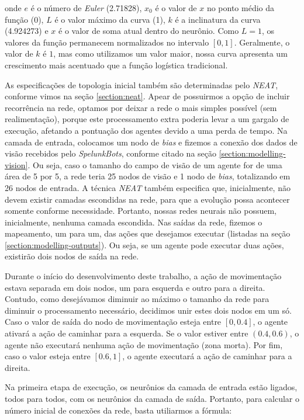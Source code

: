 onde $e$ é o número de \textit{Euler} (2.71828), $x_{0}$ é o valor de $x$ no
ponto médio da função (0), $L$ é o valor máximo da curva (1), $k$ é a
inclinatura da curva (4.924273) e $x$ é o valor de soma atual dentro do
neurônio. Como $L=1$, os valores da função permanecem normalizados no intervalo
$[0,1]$. Geralmente, o valor de $k$ é $1$, mas como utilizamos um valor maior,
nossa curva apresenta um crescimento mais acentuado que a função logística
tradicional.

As especificações de topologia inicial também são determinadas pelo
\textit{NEAT}, conforme vimos na seção \ref{section:neat}. Apear de possuirmos a
opção de incluir recorrência na rede, optamos por deixar a rede o mais simples
possível (sem realimentação), porque este processamento extra poderia levar a um
gargalo de execução, afetando a pontuação dos agentes devido a uma perda de
tempo. Na camada de entrada, colocamos um nodo de \textit{bias} e  fizemos a
conexão dos dados de visão recebidos pelo \textit{SpelunkBots}, conforme citado
na seção \ref{section:modelling-vision}. Ou seja, caso o tamanho do campo de
visão de um agente for de uma área de 5 por 5, a rede teria 25 nodos de visão e
1 nodo de \textit{bias}, totalizando em 26 nodos de entrada. A técnica
\textit{NEAT} também especifica que, inicialmente, não devem existir camadas
escondidas na rede, para que a evolução possa acontecer somente conforme
necessidade. Portanto, nossas redes neurais não possuem, inicialmente, nenhuma
camada escondida. Nas saídas da rede, fizemos o mapeamento, um para um, das
ações que desejamos executar (listadas na seção \ref{section:modelling-outputs}).
Ou seja, se um agente pode executar duas ações, existirão dois nodos de saída na
rede.

Durante o início do desenvolvimento deste trabalho, a ação de movimentação
estava separada em dois nodos, um para esquerda e outro para a direita. Contudo,
como desejávamos diminuir ao máximo o tamanho da rede para diminuir o
processamento necessário, decidimos unir estes dois nodos em um só. Caso o valor
de saída do nodo de movimentação esteja entre $[0,0.4]$, o agente ativará a ação
de caminhar para a esquerda. Se o valor estiver entre $(0.4,0.6)$, o agente não
executará nenhuma ação de movimentação (zona morta). Por fim, caso o valor
esteja entre $[0.6,1]$, o agente executará a ação de caminhar para a direita.

Na primeira etapa de execução, os neurônios da camada de entrada estão ligados,
todos para todos, com os neurônios da camada de saída. Portanto, para calcular o
número inicial de conexões da rede, basta utiliarmos a fórmula:

